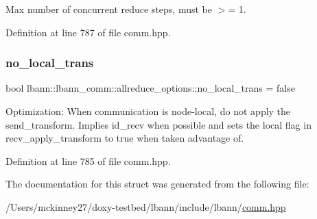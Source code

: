Max number of concurrent reduce steps, must be $>$= 1. 

Definition at line 787 of file comm.\+hpp.

\mbox{\label{structlbann_1_1lbann__comm_1_1allreduce__options_ad9890ae127412ee65a98cbdb02a4b143}} 
\subsubsection{\texorpdfstring{no\+\_\+local\+\_\+trans}{no\_local\_trans}}
{\footnotesize\ttfamily bool lbann\+::lbann\+\_\+comm\+::allreduce\+\_\+options\+::no\+\_\+local\+\_\+trans = false}

Optimization\+: When communication is node-\/local, do not apply the send\+\_\+transform. Implies id\+\_\+recv when possible and sets the local flag in recv\+\_\+apply\+\_\+transform to true when taken advantage of. 

Definition at line 785 of file comm.\+hpp.



The documentation for this struct was generated from the following file\+:\begin{DoxyCompactItemize}
\item 
/\+Users/mckinney27/doxy-\/testbed/lbann/include/lbann/\hyperlink{comm_8hpp}{comm.\+hpp}\end{DoxyCompactItemize}
